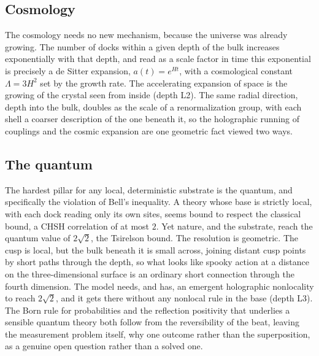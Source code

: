 \subsection{Cosmology}

The cosmology needs no new mechanism, because the universe was already growing. The number of docks within a given depth of the bulk increases exponentially with that depth, and read as a scale factor in time this exponential is precisely a de Sitter expansion, $a(t) = e^{Ht}$, with a cosmological constant $\Lambda = 3H^2$ set by the growth rate. The accelerating expansion of space is the growing of the crystal seen from inside (depth L2). The same radial direction, depth into the bulk, doubles as the scale of a renormalization group, with each shell a coarser description of the one beneath it, so the holographic running of couplings and the cosmic expansion are one geometric fact viewed two ways.

\subsection{The quantum}

The hardest pillar for any local, deterministic substrate is the quantum, and specifically the violation of Bell's inequality. A theory whose base is strictly local, with each dock reading only its own sites, seems bound to respect the classical bound, a CHSH correlation of at most $2$. Yet nature, and the substrate, reach the quantum value of $2\sqrt{2}$, the Tsirelson bound. The resolution is geometric. The cusp is local, but the bulk beneath it is small across, joining distant cusp points by short paths through the depth, so what looks like spooky action at a distance on the three-dimensional surface is an ordinary short connection through the fourth dimension. The model needs, and has, an emergent holographic nonlocality to reach $2\sqrt{2}$, and it gets there without any nonlocal rule in the base (depth L3). The Born rule for probabilities and the reflection positivity that underlies a sensible quantum theory both follow from the reversibility of the beat, leaving the measurement problem itself, why one outcome rather than the superposition, as a genuine open question rather than a solved one.
